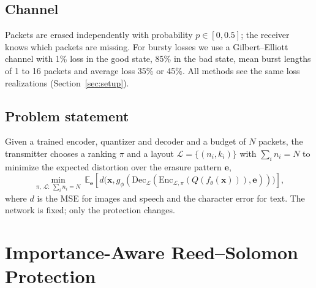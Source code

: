 \documentclass[journal]{IEEEtran}
\begin{document}
\subsection{Channel}
Packets are erased independently with probability $p\in[0,0.5]$; the receiver knows which packets are
missing. For bursty losses we use a Gilbert--Elliott channel \cite{gilbert1960capacity,elliott1963estimates}
with 1\% loss in the good state, 85\% in the bad state, mean burst lengths of 1 to 16 packets and average
loss 35\% or 45\%. All methods see the same loss realizations (Section~\ref{sec:setup}).

\subsection{Problem statement}
Given a trained encoder, quantizer and decoder and a budget of $N$ packets, the transmitter chooses a
ranking $\pi$ and a layout $\mathcal{L}=\{(n_i,k_i)\}$ with $\sum_i n_i=N$ to minimize the expected
distortion over the erasure pattern $\mathbf{e}$,
\begin{equation}
\min_{\pi,\ \mathcal{L}:\ \sum_i n_i = N}\ \mathbb{E}_{\mathbf{e}}\!\left[d\big(\mathbf{x},
g_\phi(\mathrm{Dec}_{\mathcal{L}}(\mathrm{Enc}_{\mathcal{L},\pi}(Q(f_\theta(\mathbf{x}))),\mathbf{e}))\big)\right],
\end{equation}
where $d$ is the MSE for images and speech and the character error for text. The network is fixed; only
the protection changes.

\section{Importance-Aware Reed--Solomon Protection}\label{sec:method}
\end{document}
